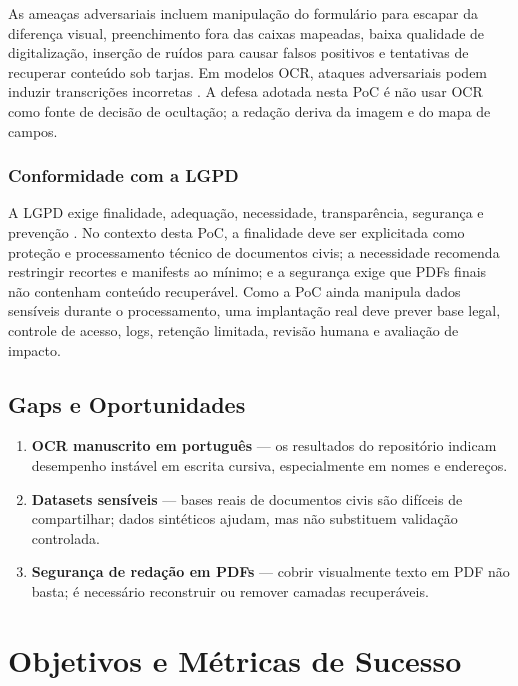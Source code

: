 \documentclass[12pt,a4paper]{article}
\begin{document}
As ameaças adversariais incluem manipulação do formulário para escapar da diferença visual, preenchimento fora das caixas mapeadas, baixa qualidade de digitalização, inserção de ruídos para causar falsos positivos e tentativas de recuperar conteúdo sob tarjas. Em modelos OCR, ataques adversariais podem induzir transcrições incorretas \cite{goodfellow2014explaining,madry2017towards}. A defesa adotada nesta PoC é não usar OCR como fonte de decisão de ocultação; a redação deriva da imagem e do mapa de campos.

\subsubsection{Conformidade com a LGPD}

A LGPD exige finalidade, adequação, necessidade, transparência, segurança e prevenção \cite{brasil2018lgpd}. No contexto desta PoC, a finalidade deve ser explicitada como proteção e processamento técnico de documentos civis; a necessidade recomenda restringir recortes e manifests ao mínimo; e a segurança exige que PDFs finais não contenham conteúdo recuperável. Como a PoC ainda manipula dados sensíveis durante o processamento, uma implantação real deve prever base legal, controle de acesso, logs, retenção limitada, revisão humana e avaliação de impacto.

\subsection{Gaps e Oportunidades}

\begin{enumerate}
    \item \textbf{OCR manuscrito em português} — os resultados do repositório indicam desempenho instável em escrita cursiva, especialmente em nomes e endereços.
    \item \textbf{Datasets sensíveis} — bases reais de documentos civis são difíceis de compartilhar; dados sintéticos ajudam, mas não substituem validação controlada.
    \item \textbf{Segurança de redação em PDFs} — cobrir visualmente texto em PDF não basta; é necessário reconstruir ou remover camadas recuperáveis.
\end{enumerate}

\section{Objetivos e Métricas de Sucesso}
\label{sec:objetivos}
\end{document}
